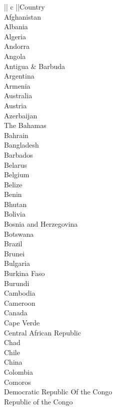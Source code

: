 \documentclass{article}
\begin{document}
    \begin{center}
    \begin{tabular} {|| c ||}Country\\ \hline 
Afghanistan\\ \hline 
Albania\\ \hline 
Algeria\\ \hline 
Andorra\\ \hline 
Angola\\ \hline 
Antigua & Barbuda\\ \hline 
Argentina\\ \hline 
Armenia\\ \hline 
Australia\\ \hline 
Austria\\ \hline 
Azerbaijan\\ \hline 
The Bahamas\\ \hline 
Bahrain\\ \hline 
Bangladesh\\ \hline 
Barbados\\ \hline 
Belarus\\ \hline 
Belgium\\ \hline 
Belize\\ \hline 
Benin\\ \hline 
Bhutan\\ \hline 
Bolivia\\ \hline 
Bosnia and Herzegovina\\ \hline 
Botswana\\ \hline 
Brazil\\ \hline 
Brunei\\ \hline 
Bulgaria\\ \hline 
Burkina Faso\\ \hline 
Burundi\\ \hline 
Cambodia\\ \hline 
Cameroon\\ \hline 
Canada\\ \hline 
Cape Verde\\ \hline 
Central African Republic\\ \hline 
Chad\\ \hline 
Chile\\ \hline 
China\\ \hline 
Colombia\\ \hline 
Comoros\\ \hline 
Democratic Republic Of the Congo\\ \hline 
Republic of the Congo\\ \hline 

\end{tabular}
\end{center}
\end{document}
